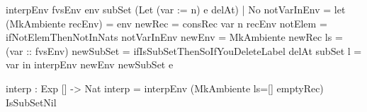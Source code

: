 \begin{code}
  interpEnv {fvsEnv} env subSet (Let (var := n) e delAt) | 
    No notVarInEnv = 
    let (MkAmbiente recEnv) = env
        newRec = 
          consRec var n recEnv 
            {notElem = ifNotElemThenNotInNats notVarInEnv}
        newEnv = MkAmbiente newRec {ls = (var :: fvsEnv)}
        newSubSet = 
          ifIsSubSetThenSoIfYouDeleteLabel delAt subSet {l = var}
    in interpEnv newEnv newSubSet e
  
interp : Exp [] -> Nat
interp = interpEnv (MkAmbiente {ls=[]} emptyRec) IsSubSetNil
\end{code}

